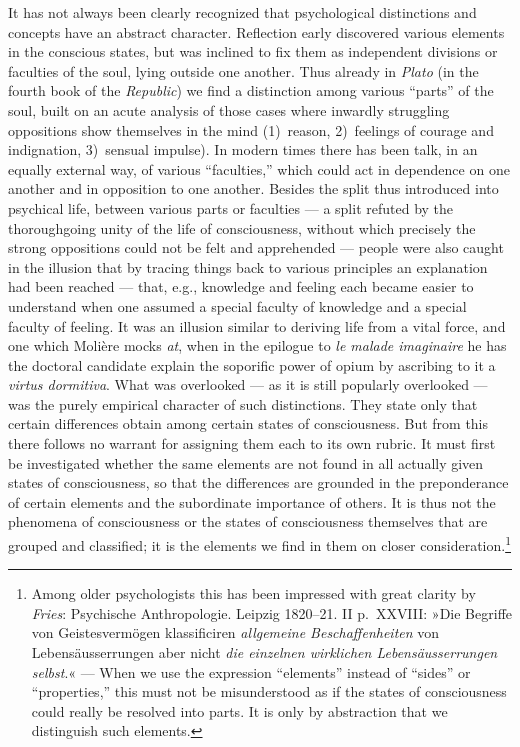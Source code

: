 \documentclass[12pt,a4paper]{book}
\newcommand{\opage}[1]{\marginnote{\footnotesize\textit{[#1]}}}
\begin{document}
It has not always been clearly recognized that psychological
distinctions and concepts have an abstract character. Reflection early
discovered various elements in the conscious states, but was inclined to
fix them as independent divisions or faculties of the soul, lying outside
one another. Thus already in \emph{Plato} (in the fourth book of the
\textit{Republic}) we find a distinction among various ``parts'' of the
soul, built on an acute analysis of those cases where inwardly struggling
oppositions show themselves in the mind (1)~reason, 2)~feelings of courage
and indignation, 3)~sensual impulse). In modern times
\opage{104}there has been talk, in an equally external way, of various
``faculties,'' which could act in dependence on one another and in
opposition to one another. Besides the split thus introduced into
psychical life, between various parts or faculties --- a split refuted by
the thoroughgoing unity of the life of consciousness, without which
precisely the strong oppositions could not be felt and apprehended ---
people were also caught in the illusion that by tracing things back to
various principles an explanation had been reached --- that, e.g.,
knowledge and feeling each became easier to understand when one assumed a
special faculty of knowledge and a special faculty of feeling. It was an
illusion similar to deriving life from a vital force, and one which
Molière mocks \emph{at}, when in the epilogue to \textit{le malade
imaginaire} he has the doctoral candidate explain the soporific power of
opium by ascribing to it a \textit{virtus dormitiva}. What was overlooked
--- as it is still popularly overlooked --- was the purely empirical
character of such distinctions. They state only that certain differences
obtain among certain states of consciousness. But from this there follows
no warrant for assigning them each to its own rubric. It must first be
investigated whether the same elements are not found in all actually
given states of consciousness, so that the differences are grounded in
the preponderance of certain elements and the subordinate importance of
others. It is thus not the phenomena of consciousness or the states of
consciousness themselves that are grouped and classified; it is the
elements we find in them on closer consideration.\footnote{Among older
psychologists this has been impressed with great clarity by
\emph{Fries}: Psychische Anthropologie. Leipzig 1820--21. II p.~XXVIII:
»Die Begriffe von Geistesvermögen klassificiren \emph{allgemeine
Beschaffenheiten} von Lebensäusserrungen aber nicht \emph{die einzelnen
wirklichen Lebensäusserrungen selbst}.« --- When we use the expression
``elements'' instead of ``sides'' or ``properties,'' this must not be
misunderstood as if the states of consciousness could really be resolved
into parts. It is only by abstraction that we distinguish such elements.}
\end{document}
